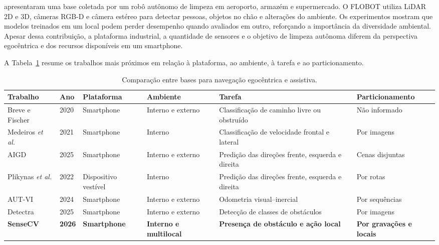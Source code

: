 \documentclass[conference]{IEEEtran}
\begin{document}
\cite{yan2020flobot} apresentaram uma base coletada por um robô autônomo de limpeza em aeroporto, armazém e supermercado. O FLOBOT utiliza LiDAR 2D e 3D, câmeras RGB-D e câmera estéreo para detectar pessoas, objetos no chão e alterações do ambiente. Os experimentos mostram que modelos treinados em um local podem perder desempenho quando avaliados em outro, reforçando a importância da diversidade ambiental. Apesar dessa contribuição, a plataforma industrial, a quantidade de sensores e o objetivo de limpeza autônoma diferem da perspectiva egocêntrica e dos recursos disponíveis em um smartphone.

A Tabela~\ref{tab:related_comparison} resume os trabalhos mais próximos em relação à plataforma, ao ambiente, à tarefa e ao particionamento.

\begin{table}[!t]
\centering
\caption{Comparação entre bases para navegação egocêntrica e assistiva.}
\label{tab:related_comparison}
\renewcommand{\arraystretch}{1.15}
\setlength{\tabcolsep}{5pt}
\scriptsize
\begin{tabular}{
p{2.4cm}
p{0.8cm}
p{2.4cm}
p{1.8cm}
p{5.1cm}
p{2.4cm}}
\hline
\textbf{Trabalho} &
\textbf{Ano} &
\textbf{Plataforma} &
\textbf{Ambiente} &
\textbf{Tarefa} &
\textbf{Particionamento} \\
\hline

Breve e Fischer \cite{breve2020} &
2020 &
Smartphone &
Interno e externo &
Classificação de caminho livre ou obstruído &
Não informado \\

Medeiros \textit{et al.} \cite{medeiros2021} &
2021 &
Smartphone &
Interno &
Classificação de velocidade frontal e lateral &
Por imagens \\

AIGD \cite{jadhav2025} &
2025 &
Smartphone &
Interno e externo &
Predição das direções frente, esquerda e direita &
Cenas disjuntas \\

Plikynas \textit{et al.} \cite{plikynas2022} &
2022 &
Dispositivo vestível &
Interno &
Predição das direções frente, esquerda e direita &
Por rotas \\

AUT-VI \cite{samadzadeh2024} &
2024 &
Smartphone &
Interno e externo &
Odometria visual--inercial &
Por sequências \\

Detectra \cite{bastidas2025detectra} &
2025 &
Smartphone &
Interno e externo &
Detecção de classes de obstáculos &
Por imagens \\

\textbf{SenseCV} &
\textbf{2026} &
\textbf{Smartphone} &
\textbf{Interno e multilocal} &
\textbf{Presença de obstáculo e ação local} &
\textbf{Por gravações e locais} \\

\hline
\end{tabular}
\end{table}
\end{document}
